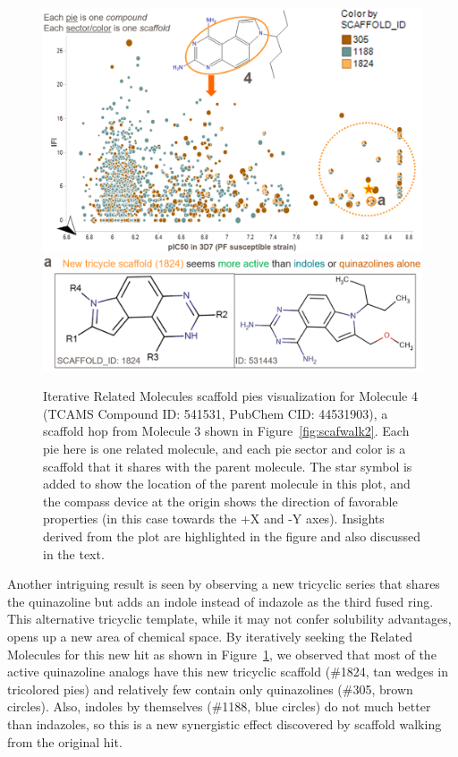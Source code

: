 \documentclass[11pt,letterpaper]{article}
\newcommand*\fref[1]{Figure~\ref{fig:#1}}
\begin{document}
\begin{figure}
  \centering
  \includegraphics[width=5.5in]{../fig/mol3_RGtool_scafpie_iter_plot_v2.png}\\
  \vspace{0.1in}
  \includegraphics[width=5in]{../fig/mol3_RGtool_scafpie_iter_struc_v2.png}
\caption{Iterative Related Molecules scaffold pies visualization for Molecule 4 (TCAMS Compound ID: 541531, PubChem CID: 44531903), a scaffold hop from Molecule 3 shown in \fref{scafwalk2}. Each pie here is one related molecule, and each pie sector and color is a scaffold that it shares with the parent molecule. The star symbol is added to show the location of the parent molecule in this plot, and the compass device at the origin shows the direction of favorable properties (in this case towards the +X and -Y axes). Insights derived from the plot are highlighted in the figure and also discussed in the text.}
\label{fig:scafwalk3}
\end{figure}

Another intriguing result is seen by observing a new tricyclic series that shares the quinazoline but adds an indole instead of indazole as the third fused ring. This alternative tricyclic template, while it may not confer solubility advantages, opens up a new area of chemical space. By iteratively seeking the Related Molecules for this new hit as shown in \fref{scafwalk3}, we observed that most of the active quinazoline analogs have this new tricyclic scaffold (\#1824, tan wedges in tricolored pies) and relatively few contain only quinazolines (\#305, brown circles). Also, indoles by themselves (\#1188, blue circles) do not much better than indazoles, so this is a new synergistic effect discovered by scaffold walking from the original hit.            
\end{document}
